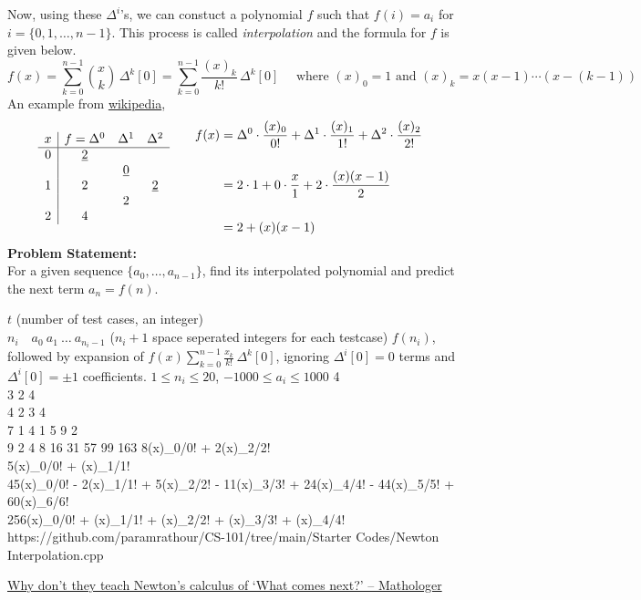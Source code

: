 Now, using these $\Delta ^{i}$'s, we can constuct a polynomial $f$ such that $f(i)=a_i$ for $i=\{0,1,\ldots,n-1\}$. This process is called \emph{interpolation} and the formula for $f$ is given below.
\begin{equation}
	f(x)=\sum _{k=0}^{n-1}{\binom {x}{k}}\,\Delta ^{k}[0]=\sum _{k=0}^{n-1}\frac{(x)_k}{k!}\,\Delta ^{k}[0]%
	\quad\text{ where $(x)_0 = 1$ and $(x)_k=x(x-1)\cdots(x-(k-1))$}
\end{equation}
An example from \href{https://en.wikipedia.org/wiki/Finite_difference#Newton's_series}{wikipedia},
\vspace{-1em}\begin{equation}
	{{
	\begin{matrix}{
	\begin{array}{c|ccc} x&f=\Delta ^{0}&\Delta ^{1}&\Delta ^{2}\\\hline 0&{\underline {2}}&&\\
	&&{\underline {0}}&\\
	1&2&&{\underline {2}}\\
	&&2&\\
	2&4&&
	\end{array}}
	&\quad {
	\begin{aligned}
	f(x)&=\Delta ^{0}\cdot {\dfrac {(x)_{0}}{0!}}+\Delta ^{1}\cdot {\dfrac {(x)_{1}}{1!}}+\Delta ^{2}\cdot {\dfrac {(x)_{2}}{2!}}\quad\\\\
	&=2\cdot 1+0\cdot {\dfrac {x}{1}}+2\cdot {\dfrac {(x)(x-1)}{2}}\\\\
	&=2+(x)(x-1)
	\end{aligned}}\end{matrix}}}\vspace{-0.5em}
\end{equation}
\textbf{Problem Statement:}\\
For a given sequence $\{a_0,\ldots,a_{n-1}\}$, find its interpolated polynomial and predict the next term $a_{n}=f(n)$.
\begin{testcases}
	{$t$ \hfill(number of test cases, an integer)\\$n_i\quad a_{0}\ a_1\ \ldots\ a_{n_i-1}$ \hfill($n_i+1$ space seperated integers for each testcase)}
	{$f(n_i)$, followed by expansion of $f(x)\displaystyle\sum _{k=0}^{n-1}\frac{x_k}{k!}\,\Delta ^{k}[0]$, ignoring $\Delta ^{i}[0]=0$ terms and $\Delta ^{i}[0]=\pm1$ coefficients.}
	{$1 \leq n_i \leq 20$, $-1000 \leq a_i \leq 1000$}
	{4\\3 2 4\\4 2 3 4\\7 1 4 1 5 9 2\\9 2 4 8 16 31 57 99 163}
	{8(x)\_{0}/0! + 2(x)\_{2}/2!\\5\quad(x)\_{0}/0! + (x)\_{1}/1!\\45(x)\_{0}/0! - 2(x)\_{1}/1! + 5(x)\_{2}/2! - 11(x)\_{3}/3! + 24(x)\_{4}/4! - 44(x)\_{5}/5! + 60(x)\_{6}/6!\\256\quad(x)\_{0}/0! + (x)\_{1}/1! + (x)\_{2}/2! + (x)\_{3}/3! + (x)\_{4}/4!}
	{https://github.com/paramrathour/CS-101/tree/main/Starter Codes/Newton Interpolation.cpp}
\end{testcases}
\begin{funvideo}
	\href{https://youtu.be/4AuV93LOPcE}{Why don't they teach Newton's calculus of `What comes next?' -- Mathologer}
\end{funvideo}